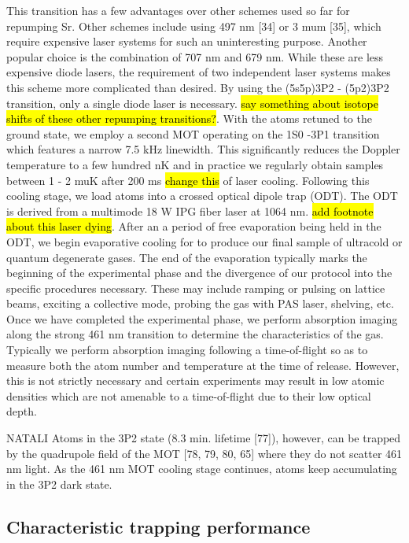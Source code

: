 This transition has a few advantages over other schemes used so far for repumping Sr. 
Other schemes include using 497 nm [34] or 3 mum [35], which require expensive laser systems for such an uninteresting purpose. 
Another popular choice is the combination of 707 nm and 679 nm. 
While these are less expensive diode lasers, the requirement of two independent laser systems makes this scheme more complicated than desired. 
By using the (5s5p)3P2 - (5p2)3P2 transition, only a single diode laser is necessary. \hl{say something about isotope shifts of these other repumping transitions?}. 
With the atoms retuned to the ground state, we employ a second MOT operating on the 1S0 -3P1 transition which features a narrow 7.5 kHz linewidth. 
This significantly reduces the Doppler temperature to a few hundred nK and in practice we regularly obtain samples between 1 - 2 muK after 200 ms \hl{change this} of laser cooling. Following this cooling stage, we load atoms into a crossed optical dipole trap (ODT). 
The ODT is derived from a multimode 18 W IPG fiber laser at 1064 nm. \hl{add footnote about this laser dying}.
After an a period of free evaporation being held in the ODT, we begin evaporative cooling for to produce our final sample of ultracold or quantum degenerate gases.
The end of the evaporation typically marks the beginning of the experimental phase and the divergence of our protocol into the specific procedures necessary. 
These may include ramping or pulsing on lattice beams, exciting a collective mode, probing the gas with PAS laser, shelving, etc. 
Once we have completed the experimental phase, we perform absorption imaging along the strong 461 nm transition to determine the characteristics of the gas. 
Typically we perform absorption imaging following a time-of-flight so as to measure both the atom number and temperature at the time of release. 
However, this is not strictly necessary and certain experiments may result in low atomic densities which are not amenable to a time-of-flight due to their low optical depth.

NATALI
Atoms in the 3P2 state (8.3 min. lifetime [77]), however, can be trapped by the quadrupole field of the MOT [78, 79, 80, 65] where they do not scatter 461 nm light. As the 461 nm MOT cooling stage continues, atoms keep accumulating in the 3P2 dark state.

\subsection{Characteristic trapping performance} \label{sec:benchmark_trapping}

